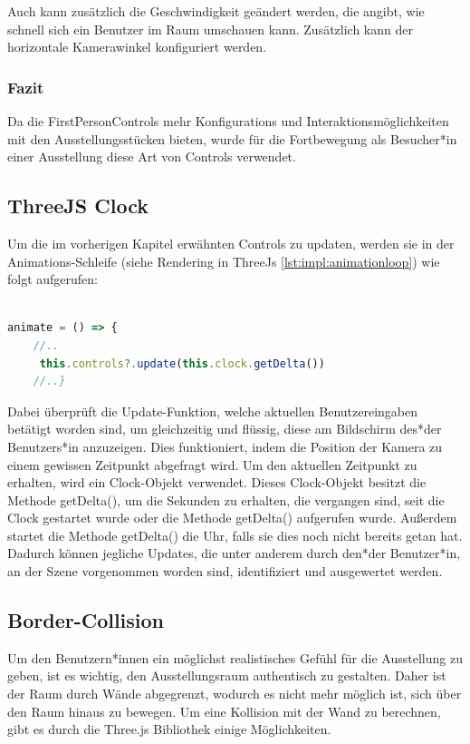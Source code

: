 Auch kann zusätzlich die Geschwindigkeit geändert werden, die angibt, wie schnell sich ein Benutzer im Raum umschauen kann. Zusätzlich kann der horizontale Kamerawinkel konfiguriert werden.

\subsubsection{Fazit}
Da die FirstPersonControls mehr Konfigurations und Interaktionsmöglichkeiten mit den Ausstellungsstücken bieten, wurde für die Fortbewegung als Besucher*in einer Ausstellung diese Art von Controls verwendet.

\cite{PointerLockControls}

\subsection{ThreeJS Clock}
\label{Clock}

Um die im vorherigen Kapitel erwähnten Controls zu updaten, werden sie in der Animations-Schleife (siehe Rendering in ThreeJs \ref{lst:impl:animationloop}) wie folgt aufgerufen: 

\begin{lstlisting}[caption={Controls updaten},language=TypeScript]
    
animate = () => {
    //..
     this.controls?.update(this.clock.getDelta())
    //..}

    \end{lstlisting}

Dabei überprüft die Update-Funktion, welche aktuellen Benutzereingaben betätigt worden sind, um gleichzeitig und flüssig, diese am Bildschirm des*der Benutzers*in anzuzeigen. Dies funktioniert, indem die Position der Kamera zu einem gewissen Zeitpunkt abgefragt wird. Um den aktuellen Zeitpunkt zu erhalten, wird ein Clock-Objekt verwendet. Dieses Clock-Objekt besitzt die Methode getDelta(), um die Sekunden zu erhalten, die vergangen sind, seit die Clock gestartet wurde oder die Methode getDelta() aufgerufen wurde. Außerdem startet die Methode getDelta() die Uhr, falls sie dies noch nicht bereits getan hat. Dadurch können jegliche Updates, die unter anderem durch den*der Benutzer*in, an der Szene vorgenommen worden sind, identifiziert und ausgewertet werden.

\cite{ThreeJsClock}

\subsection{Border-Collision}
Um den Benutzern*innen ein möglichst realistisches Gefühl für die Ausstellung zu geben, ist es wichtig, den Ausstellungsraum authentisch zu gestalten. Daher ist der Raum durch Wände abgegrenzt, wodurch es nicht mehr möglich ist, sich über den Raum hinaus zu bewegen. Um eine Kollision mit der Wand zu berechnen, gibt es durch die Three.js Bibliothek einige Möglichkeiten.


